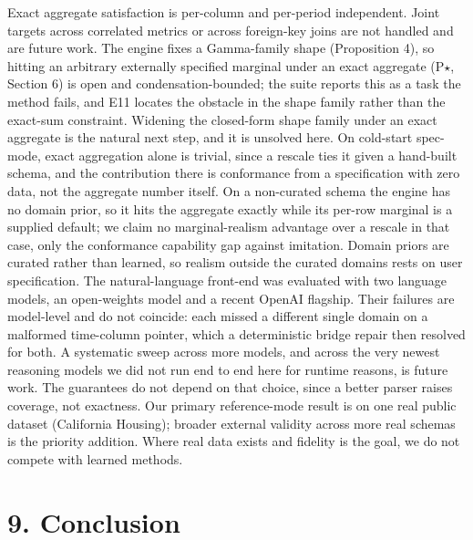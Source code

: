 Exact aggregate satisfaction is per-column and per-period independent.
Joint targets across correlated metrics or across foreign-key joins are
not handled and are future work. The engine fixes a Gamma-family shape
(Proposition 4), so hitting an arbitrary externally specified marginal
under an exact aggregate (P\ensuremath{\star}, Section 6) is open and
condensation-bounded; the suite reports this as a task the method fails,
and E11 locates the obstacle in the shape family rather than the
exact-sum constraint. Widening the closed-form shape family under an
exact aggregate is the natural next step, and it is unsolved here. On
cold-start spec-mode, exact aggregation alone is trivial, since a
rescale ties it given a hand-built schema, and the contribution there is
conformance from a specification with zero data, not the aggregate
number itself. On a non-curated schema the engine has no domain prior,
so it hits the aggregate exactly while its per-row marginal is a
supplied default; we claim no marginal-realism advantage over a rescale
in that case, only the conformance capability gap against imitation.
Domain priors are curated rather than learned, so realism outside the
curated domains rests on user specification. The natural-language
front-end was evaluated with two language models, an open-weights model
and a recent OpenAI flagship. Their failures are model-level and do not
coincide: each missed a different single domain on a malformed
time-column pointer, which a deterministic bridge repair then resolved
for both. A systematic sweep across more models, and across the very
newest reasoning models we did not run end to end here for runtime
reasons, is future work. The guarantees do not depend on that choice,
since a better parser raises coverage, not exactness. Our primary
reference-mode result is on one real public dataset (California
Housing); broader external validity across more real schemas is the
priority addition. Where real data exists and fidelity is the goal, we
do not compete with learned methods.

\hypertarget{conclusion}{%
\section{9. Conclusion}\label{conclusion}}

